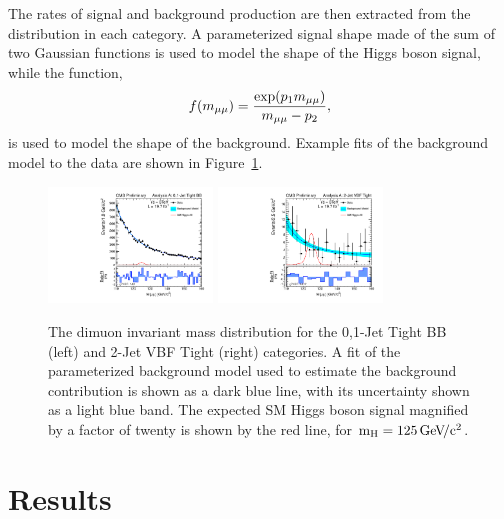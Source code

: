 \documentclass[10pt]{article}
\begin{document}
The rates of signal and background production are then extracted from the 
\Mmumu{} distribution 
in each category.  A parameterized signal shape made of the sum of
two Gaussian functions is used to model the shape of the Higgs boson signal, while
the function,
\begin{equation}
f(m_{\mu\mu}{}) = \frac{\exp(p_1 m_{\mu\mu}{})}{m_{\mu\mu}{}-p_2},
\end{equation}
is used to model the shape of the background.
Example fits of the background model to the data are shown in Figure~\ref{fig:mass}.

\begin{figure}[htb]
\centering
\includegraphics[width=0.39\textwidth]{plotsPublic/mass_AnanlysisA/pdf/CombSplitAll_8TeV_125_Jets01PassPtG10BB.pdf}
\includegraphics[width=0.39\textwidth]{plotsPublic/mass_AnanlysisA/pdf/CombSplitAll_8TeV_125_Jet2CutsVBFPass.pdf}
\caption{ The dimuon invariant mass distribution for the 0,1-Jet Tight BB (left) and 2-Jet VBF Tight (right) categories.
            A fit of the parameterized background model used to estimate the background contribution is shown
            as a dark blue line, with its uncertainty shown as a light blue band.  The expected SM Higgs boson
            signal magnified by a factor of twenty is shown by the red line, for $\mathrm{m_H}{}=125\,\mathrm{Ge\kern -0.1em V\!/c^2}{}$.
            }
\label{fig:mass}
\end{figure}

\section{Results}
\end{document}
